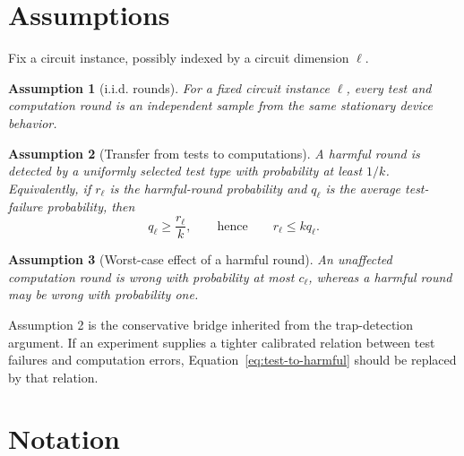\documentclass[11pt]{article}
\newtheorem{assumption}{Assumption}
\begin{document}
\section{Assumptions}

Fix a circuit instance, possibly indexed by a circuit dimension $\ell$.

\begin{assumption}[i.i.d. rounds]
For a fixed circuit instance $\ell$, every test and computation round is an
independent sample from the same stationary device behavior.
\end{assumption}

\begin{assumption}[Transfer from tests to computations]
A harmful round is detected by a uniformly selected test type with probability
at least $1/k$. Equivalently, if $r_\ell$ is the harmful-round probability and
$q_\ell$ is the average test-failure probability, then
\begin{equation}
  q_\ell \ge \frac{r_\ell}{k},
  \qquad\text{hence}\qquad
  r_\ell\le kq_\ell.
  \label{eq:test-to-harmful}
\end{equation}
\end{assumption}

\begin{assumption}[Worst-case effect of a harmful round]
An unaffected computation round is wrong with probability at most $c_\ell$,
whereas a harmful round may be wrong with probability one.
\end{assumption}

Assumption 2 is the conservative bridge inherited from the trap-detection
argument. If an experiment supplies a tighter calibrated relation between test
failures and computation errors, Equation~\eqref{eq:test-to-harmful} should be
replaced by that relation.

\section{Notation}
\end{document}
